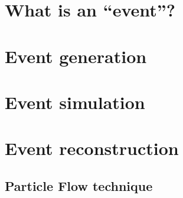 \section{What is an ``event''? \label{sec:event}}




\section{Event generation \label{sec:event_generation}}




\section{Event simulation \label{sec:event_simulation}}




\section{Event reconstruction \label{sec:event_reconstruction}}




 

\subsection{Particle Flow technique \label{sec:event_reco_pf}}

